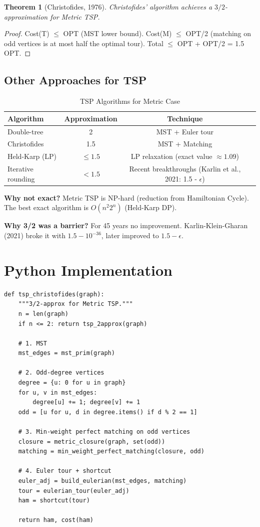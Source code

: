 \documentclass[11pt,oneside]{book}
\newtheorem{theorem}{Theorem}[chapter]
\begin{document}
\begin{theorem}[Christofides, 1976]
Christofides' algorithm achieves a $3/2$-approximation for Metric TSP.
\end{theorem}
\begin{proof}
Cost(T) $\leq$ OPT (MST lower bound). Cost(M) $\leq$ OPT/2 (matching on odd vertices is at most half the optimal tour). Total $\leq$ OPT + OPT/2 = 1.5 OPT.
\end{proof}

\subsection{Other Approaches for TSP}

\begin{table}[H]
\centering
\caption{TSP Algorithms for Metric Case}
\begin{tabular}{lccc}
\toprule
Algorithm & Approximation & Technique \\
\midrule
Double-tree & 2 & MST + Euler tour \\
Christofides & 1.5 & MST + Matching \\
Held-Karp (LP) & $\leq 1.5$ & LP relaxation (exact value $\approx 1.09$) \\
Iterative rounding & $< 1.5$ & Recent breakthroughs (Karlin et al., 2021: 1.5 - $\epsilon$) \\
\bottomrule
\end{tabular}
\end{table}

\textbf{Why not exact?} Metric TSP is NP-hard (reduction from Hamiltonian Cycle). The best exact algorithm is $O(n^2 2^n)$ (Held-Karp DP).

\textbf{Why 3/2 was a barrier?} For 45 years no improvement. Karlin-Klein-Gharan (2021) broke it with $1.5 - 10^{-36}$, later improved to $1.5 - \epsilon$.

\section{Python Implementation}

\begin{lstlisting}[style=python, caption=Christofides TSP 3/2-Approximation]
def tsp_christofides(graph):
    """3/2-approx for Metric TSP."""
    n = len(graph)
    if n <= 2: return tsp_2approx(graph)
    
    # 1. MST
    mst_edges = mst_prim(graph)
    
    # 2. Odd-degree vertices
    degree = {u: 0 for u in graph}
    for u, v in mst_edges:
        degree[u] += 1; degree[v] += 1
    odd = [u for u, d in degree.items() if d % 2 == 1]
    
    # 3. Min-weight perfect matching on odd vertices
    closure = metric_closure(graph, set(odd))
    matching = min_weight_perfect_matching(closure, odd)
    
    # 4. Euler tour + shortcut
    euler_adj = build_eulerian(mst_edges, matching)
    tour = eulerian_tour(euler_adj)
    ham = shortcut(tour)
    
    return ham, cost(ham)
\end{lstlisting}
\end{document}
